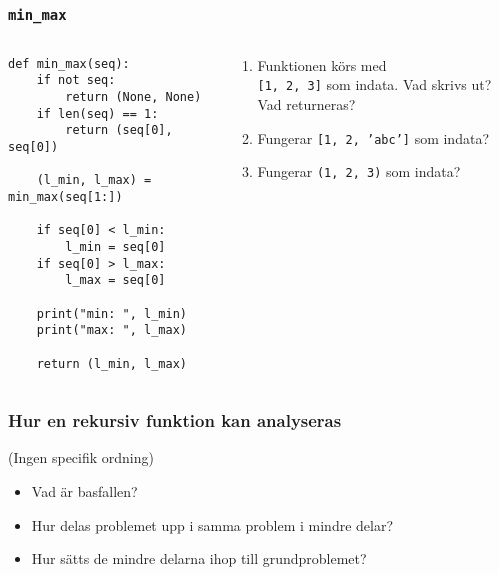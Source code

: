 \documentclass{beamer}
\begin{document}
  \begin{frame}[fragile]
    \frametitle{\texttt{min\_max}}

    \begin{columns}
      \begin{column}{0.48\textwidth}
        \begin{verbatim}
def min_max(seq):
    if not seq:
        return (None, None)
    if len(seq) == 1:
        return (seq[0], seq[0])

    (l_min, l_max) = min_max(seq[1:])

    if seq[0] < l_min:
        l_min = seq[0]
    if seq[0] > l_max:
        l_max = seq[0]

    print("min: ", l_min)
    print("max: ", l_max)

    return (l_min, l_max)
        \end{verbatim}


      \end{column}%
      \begin{column}{0.48\textwidth}
        \begin{enumerate}
          \item Funktionen körs med \\ \texttt{[1, 2, 3]} som indata. Vad skrivs ut? Vad returneras?
          \item Fungerar \texttt{[1, 2, 'abc']} som indata?
          \item Fungerar \texttt{(1, 2, 3)} som indata?
        \end{enumerate}
      \end{column}
    \end{columns}

  \end{frame}

  \begin{frame}
    \frametitle{Hur en rekursiv funktion kan analyseras}

    (Ingen specifik ordning)

    \begin{itemize}
      \item Vad är basfallen?
      \item Hur delas problemet upp i samma problem i mindre delar?
      \item Hur sätts de mindre delarna ihop till grundproblemet?
    \end{itemize}

  \end{frame}
\end{document}
